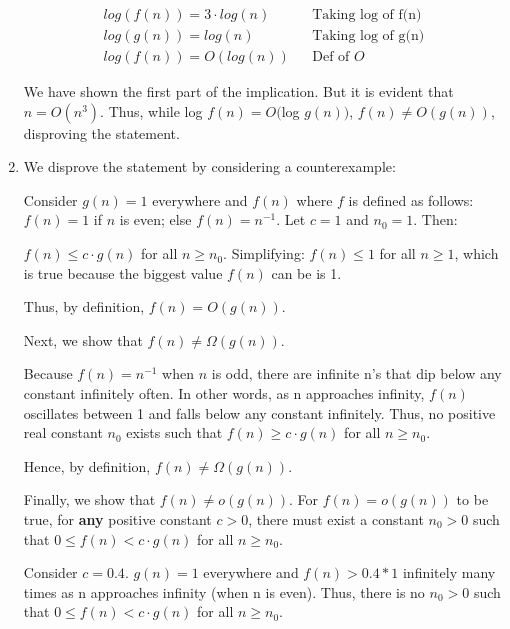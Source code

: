 \documentclass[a4paper]{report}
\begin{document}
\begin{enumerate}
      \begin{align}
        log(f(n)) = 3 \cdot log(n)                    &&\text{Taking log of f(n)}\\
        log(g(n)) = log(n)                            &&\text{Taking log of g(n)}\\
        log(f(n)) = O(log(n))                         &&\text{Def of $O$}
      \end{align}

      We have shown the first part of the implication. But it is evident that $n = O(n^3)$.
      Thus, while log $f(n) = O($log $g(n))$, $f(n) \neq O(g(n))$, disproving the statement.

    \bigskip
    \setcounter{equation}{0}
    \item We disprove the statement by considering a counterexample: 

      Consider $g(n) = 1$ everywhere and $f(n)$ where $f$ is defined as follows: $f(n) = 1$ if $n$ is even; else $f(n) = n^{-1}$.
      Let $c = 1$ and $n_{0} = 1$. Then:

      $f(n) \leq c \cdot g(n)$ for all $n \geq n_{0}$.
      Simplifying: $f(n) \leq 1$ for all $n \geq 1$, which is true because the biggest value $f(n)$ can be is 1.

      Thus, by definition, $f(n) = O(g(n))$.

      Next, we show that $f(n) \neq \Omega(g(n))$.

      Because $f(n) = n^{-1}$ when $n$ is odd, there are infinite n's that dip below any constant infinitely often.
      In other words, as n approaches infinity, $f(n)$ oscillates between 1 and falls below any constant infinitely. 
      Thus, no positive real constant $n_{0}$ exists such that $f(n) \geq c \cdot g(n)$ for all $n \geq n_{0}$.

      Hence, by definition, $f(n) \neq \Omega(g(n))$. 
      
      Finally, we show that $f(n) \neq o(g(n))$.
      For $f(n) = o(g(n))$ to be true, for {\bf any} positive constant $c > 0$, there must exist a constant $n_{0} > 0$ such that
      $0 \leq f(n) < c \cdot g(n)$ for all $n \geq n_{0}$. 

      Consider $c = 0.4$. $g(n) = 1$ everywhere and $f(n) > 0.4 * 1$ infinitely many times as n approaches infinity 
      (when n is even). Thus, there is no $n_{0} > 0 $ such that $0 \leq f(n) < c \cdot g(n)$ for all $n \geq n_{0}$.  
      

\end{enumerate}
\end{document}
